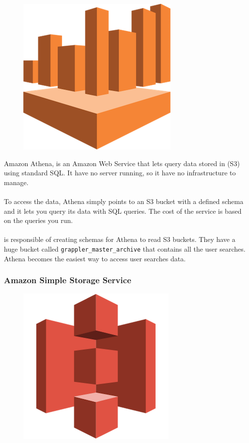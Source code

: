 \begin{figure}[H]
\includegraphics[scale=0.1]{resources/athena-logo.png}
\end{figure}

Amazon Athena\cite{athena}, is an Amazon Web Service that lets query data stored in  (S3) using standard SQL\cite{sql}. It have no server running, so it have no infrastructure to manage.
\\\\
To access the data, Athena simply points to an S3 bucket with a defined schema and it lets you query its data with SQL queries. The cost of the service is based on the queries you run.
\\\\
 is responsible of creating schemas for Athena to read S3 buckets. They have a huge bucket called \texttt{grappler\_master\_archive} that contains all the user searches. Athena becomes the easiest way to access user searches data.

\subsubsection{Amazon Simple Storage Service} \label{s3}

\begin{figure}[H]
\includegraphics[scale=0.1]{resources/s3-logo.png}
\end{figure}


